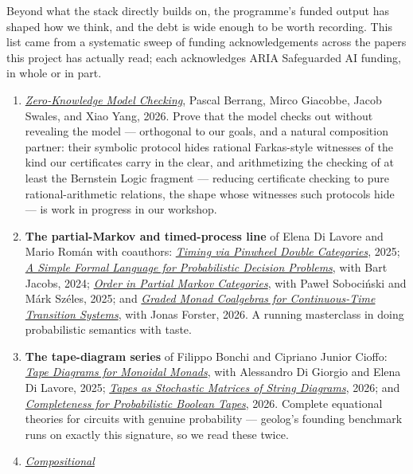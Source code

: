 Beyond what the stack directly builds on, the programme's funded
output has shaped how we think, and the debt is wide enough to be
worth recording. This list came from a systematic sweep of funding
acknowledgements across the papers this project has actually read;
each acknowledges ARIA Safeguarded AI funding, in whole or in part.

\begin{enumerate}
  \item \href{https://arxiv.org/abs/2605.00487}{\emph{Zero-Knowledge
    Model Checking}}, Pascal Berrang, Mirco Giacobbe, Jacob Swales,
    and Xiao Yang, 2026. Prove that the model checks out without
    revealing the model --- orthogonal to our goals, and a natural
    composition partner: their symbolic protocol hides rational
    Farkas-style witnesses of the kind our certificates carry in the
    clear, and arithmetizing the checking of at least the Bernstein
    Logic fragment --- reducing certificate checking to pure
    rational-arithmetic relations, the shape whose witnesses such
    protocols hide --- is work in progress in our workshop.
  \item \textbf{The partial-Markov and timed-process line} of Elena
    Di Lavore and Mario Rom\'an with coauthors:
    \href{https://arxiv.org/abs/2504.12846}{\emph{Timing via Pinwheel
    Double Categories}}, 2025;
    \href{https://arxiv.org/abs/2410.10643}{\emph{A Simple Formal
    Language for Probabilistic Decision Problems}}, with Bart Jacobs,
    2024; \href{https://arxiv.org/abs/2507.19424}{\emph{Order in
    Partial Markov Categories}}, with Pawe\l{} Soboci\'nski and
    M\'ark Sz\'eles, 2025; and
    \href{https://arxiv.org/abs/2605.06268}{\emph{Graded Monad
    Coalgebras for Continuous-Time Transition Systems}}, with Jonas
    Forster, 2026. A running masterclass in doing probabilistic
    semantics with taste.
  \item \textbf{The tape-diagram series} of Filippo Bonchi and
    Cipriano Junior Cioffo:
    \href{https://arxiv.org/abs/2503.22819}{\emph{Tape Diagrams for
    Monoidal Monads}}, with Alessandro Di Giorgio and Elena Di
    Lavore, 2025; \href{https://arxiv.org/abs/2601.01472}{\emph{Tapes
    as Stochastic Matrices of String Diagrams}}, 2026; and
    \href{https://arxiv.org/abs/2606.19017}{\emph{Completeness for
    Probabilistic Boolean Tapes}}, 2026. Complete equational theories
    for circuits with genuine probability --- geolog's founding
    benchmark runs on exactly this signature, so we read these
    twice.
  \item \href{https://arxiv.org/abs/2405.09391}{\emph{Compositional
}}
\end{enumerate}
